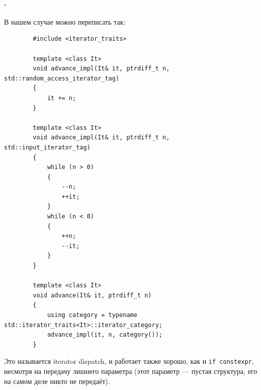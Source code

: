 \documentclass{article}
\begin{document}
    \paragraph{.}
    В нашем случае можно переписать так:
    \begin{verbatim}
        #include <iterator_traits>

        template <class It>
        void advance_impl(It& it, ptrdiff_t n, std::random_access_iterator_tag)
        {
            it += n;
        }

        template <class It>
        void advance_impl(It& it, ptrdiff_t n, std::input_iterator_tag)
        {
            while (n > 0)
            {
                --n;
                ++it;
            }
            while (n < 0)
            {
                ++n;
                --it;
            }
        }

        template <class It>
        void advance(It& it, ptrdiff_t n)
        {
            using category = typename std::iterator_traits<It>::iterator_category;
            advance_impl(it, n, category());
        }
    \end{verbatim}
    Это называется iterator dispatch, и работает также хорошо, как и \texttt{if constexpr}, несмотря на передачу лишнего параметра (этот параметр --- пустая структура, его на самом деле никто не передаёт).
\end{document}
